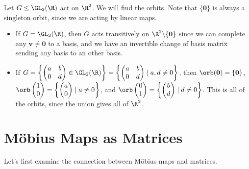 \documentclass[a4]{scrreprt}
\newcommand{\newsection}{\section}
\begin{document}
\begin{example}
	Let $G \leq \GL_2(\R)$ act on $\R^2$. We will find the orbits. 
	Note that $\{\mathbf{0}\}$ is always a singleton orbit, since we are acting by linear maps.
	
\begin{itemize}
	\item If $G = \GL_2(\R)$, then $G$ acts transitively on $\R^2\backslash \{\mathbf{0}\}$ since we can complete any $\mathbf{v} \neq \mathbf{0}$ to a basis, and we have an invertible change of basis matrix sending any basis to an other basis.
	\item If $G = \left\{\begin{pmatrix}
		a & b \\ 0 & d
	\end{pmatrix} \in \GL_2(\R)\right\} =\left\{ \begin{pmatrix}
		a & b \\
		0 & d
	\end{pmatrix} \mid a, d \neq 0 \right\}$, then $\orb(\mathbf{0}) = \{\mathbf{0}\}$, $\orb\begin{pmatrix}
		1 \\ 0
	\end{pmatrix} = \left\{\begin{pmatrix}
		a \\ 0
	\end{pmatrix} \mid a \neq 0 \right\}$, and $\orb\begin{pmatrix}
		0 \\ 1
	\end{pmatrix} =\left \{\begin{pmatrix}
		b\\ d
	\end{pmatrix} \mid d \neq 0 \right\}$. This is all of the orbits, since the union gives all of $\R^2$.
\end{itemize}
\end{example}

\newsection{Möbius Maps as Matrices}

Let's first examine the connection between Möbius maps and matrices.
\end{document}
